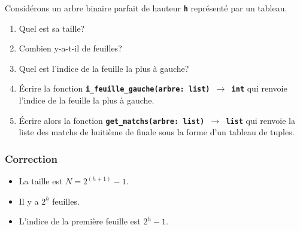 \documentclass[svgnames,11pt]{beamer}
\begin{document}
\begin{frame}
    \frametitle{}
\begin{center}
\end{center}

    \begin{activite}
        Considérons un arbre binaire parfait de hauteur \textbf{\texttt{h}} représenté par un tableau.
    \begin{enumerate}
        \item Quel est sa taille?
        \item Combien y-a-t-il de feuilles?
        \item Quel est l'indice de la feuille la plus à gauche?
        \item Écrire la fonction \textbf{\texttt{i\_feuille\_gauche(arbre: list) $\rightarrow$ int}} qui renvoie l'indice de la feuille la plus à gauche.
        \item Écrire alors la fonction \textbf{\texttt{get\_matchs(arbre: list) $\rightarrow$ list}} qui renvoie la liste des matchs de huitième de finale sous la forme d'un tableau de tuples.
    \end{enumerate}
    \end{activite}

\end{frame}
\begin{frame}
    \frametitle{Correction}

    \begin{itemize}
        \item La taille est $N=2^{(h+1)}-1$.
        \item Il y a $2^h$ feuilles.
        \item L'indice de la première feuille est $2^h-1$.
    \end{itemize}

\end{frame}
\end{document}
